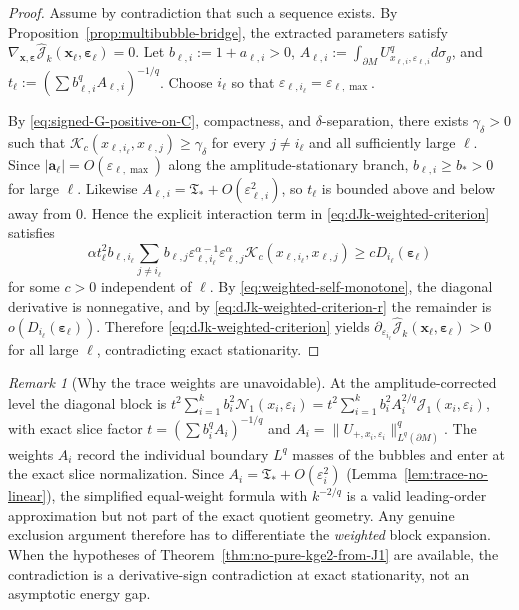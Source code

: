 \documentclass[11pt,reqno,a4paper]{amsart}
\numberwithin{equation}{section}
\theoremstyle{plain}
\theoremstyle{remark}
\newtheorem{remark}[theorem]{Remark}
\theoremstyle{plain}
\begin{document}
\begin{proof}
Assume by contradiction that such a sequence exists.
By Proposition~\ref{prop:multibubble-bridge}, the extracted parameters satisfy
$\nabla_{\mathbf x,\boldsymbol\varepsilon}\hat{\mathcal J}_k
(\mathbf x_\ell,\boldsymbol\varepsilon_\ell)=0$.
Let $b_{\ell,i}:=1+a_{\ell,i}>0$,
$A_{\ell,i}:=\int_{\partial M}U_{x_{\ell,i},\varepsilon_{\ell,i}}^qd\sigma_g$, and
$t_\ell:=(\sum b_{\ell,i}^qA_{\ell,i})^{-1/q}$.
Choose $i_\ell$ so that
$\varepsilon_{\ell,i_\ell}=\varepsilon_{\ell,\max}$.

By \eqref{eq:signed-G-positive-on-C}, compactness, and $\delta$-separation,
there exists $\gamma_\delta>0$ such that
$\mathcal K_c(x_{\ell,i_\ell},x_{\ell,j})\ge\gamma_\delta$
for every $j\neq i_\ell$ and all sufficiently large $\ell$.
Since $|\mathbf a_\ell|=O(\varepsilon_{\ell,\max})$ along the amplitude-stationary branch,
$b_{\ell,i}\ge b_*>0$ for large $\ell$. Likewise
$A_{\ell,i}=\mathfrak T_\ast+O(\varepsilon_{\ell,i}^2)$, so
$t_\ell$ is bounded above and below away from $0$.
Hence the explicit interaction term in
\eqref{eq:dJk-weighted-criterion} satisfies
\[
\alpha t_\ell^2 b_{\ell,i_\ell}
\sum_{j\neq i_\ell}b_{\ell,j}
\varepsilon_{\ell,i_\ell}^{\alpha-1}\varepsilon_{\ell,j}^{\alpha}
\mathcal K_c(x_{\ell,i_\ell},x_{\ell,j})
\ge
cD_{i_\ell}(\boldsymbol\varepsilon_\ell)
\]
for some $c>0$ independent of $\ell$.
By \eqref{eq:weighted-self-monotone}, the diagonal derivative is nonnegative,
and by \eqref{eq:dJk-weighted-criterion-r} the remainder is
$o(D_{i_\ell}(\boldsymbol\varepsilon_\ell))$.
Therefore \eqref{eq:dJk-weighted-criterion} yields
$\partial_{\varepsilon_{i_\ell}}\hat{\mathcal J}_k
(\mathbf x_\ell,\boldsymbol\varepsilon_\ell)>0$
for all large $\ell$, contradicting exact stationarity.
\end{proof}

\begin{remark}[Why the trace weights are unavoidable]
\label{rem:Jk-interaction-amplitudes}
At the amplitude-corrected level the diagonal block is
$t^2\sum_{i=1}^k b_i^2\mathcal N_1(x_i,\varepsilon_i)
=t^2\sum_{i=1}^k b_i^2 A_i^{2/q}\mathcal J_1(x_i,\varepsilon_i)$,
with exact slice factor $t=(\sum b_i^qA_i)^{-1/q}$ and
$A_i=\|U_{+,x_i,\varepsilon_i}\|_{L^q(\partial M)}^q$.
The weights $A_i$ record the individual boundary $L^q$ masses of the bubbles
and enter at the exact slice normalization.
Since $A_i=\mathfrak T_*+O(\varepsilon_i^2)$ (Lemma~\ref{lem:trace-no-linear}),
the simplified equal-weight formula with $k^{-2/q}$ is a valid leading-order
approximation but not part of the exact quotient geometry.
Any genuine exclusion argument therefore has to differentiate the
\emph{weighted} block expansion.
When the hypotheses of Theorem~\ref{thm:no-pure-kge2-from-J1} are available,
the contradiction is a derivative-sign contradiction at exact stationarity,
not an asymptotic energy gap.
\end{remark}
\end{document}
